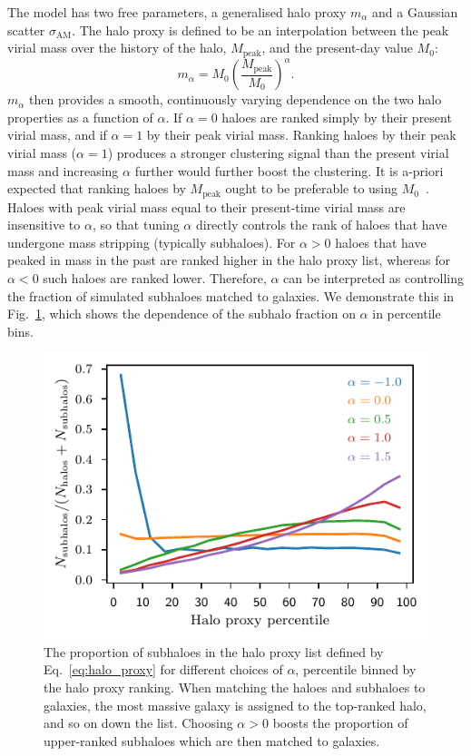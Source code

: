 \documentclass[usenatbib,useAMS]{mnras}
\newcommand{\scatter}{\ensuremath{\sigma_{\mathrm{AM}}}}
\begin{document}
The model has two free parameters, a generalised halo proxy $m_{\alpha}$ and a Gaussian scatter $\scatter$. The halo proxy is defined to be an interpolation between the peak virial mass over the history of the halo, $M_\text{peak}$, and the present-day value $M_0$:
%
\begin{equation}\label{eq:halo_proxy}
    m_{\alpha}
    =
    M_0
    \left( \frac{M_{\mathrm{peak}}}{M_0} \right)^{\alpha}.
\end{equation}
%
$m_{\alpha}$ then provides a smooth, continuously varying dependence on the two halo properties as a function of $\alpha$. If $\alpha = 0$ haloes are ranked simply by their present virial mass, and if $\alpha = 1$ by their peak virial mass. Ranking haloes by their peak virial mass ($\alpha = 1$) produces a stronger clustering signal than the present virial mass and increasing $\alpha$ further would further boost the clustering. It is a-priori expected that ranking haloes by $M_\text{peak}$ ought to be preferable to using $M_0$~\citep{Conroy2006}. Haloes with peak virial mass equal to their present-time virial mass are insensitive to $\alpha$, so that tuning $\alpha$ directly controls the rank of haloes that have undergone mass stripping (typically subhaloes). For $\alpha > 0$ haloes that have peaked in mass in the past are ranked higher in the halo proxy list, whereas for $\alpha < 0$ such haloes are ranked lower. Therefore, $\alpha$ can be interpreted as controlling the fraction of simulated subhaloes matched to galaxies.
We demonstrate this in Fig.~\ref{fig:subhalo_fractions}, which shows the dependence of the subhalo fraction on $\alpha$ in percentile bins.

% 
\begin{figure}
    \centering
    \includegraphics[width=1.0\columnwidth]{Figures/mvir_subhalos_fractions.pdf}
    \caption{The proportion of subhaloes in the halo proxy list defined by Eq.~\eqref{eq:halo_proxy} for different choices of $\alpha$, percentile binned by the halo proxy ranking. When matching the haloes and subhaloes to galaxies, the most massive galaxy is assigned to the top-ranked halo, and so on down the list. Choosing $\alpha > 0$ boosts the proportion of upper-ranked subhaloes which are then matched to galaxies.}
    \label{fig:subhalo_fractions}
\end{figure}
\end{document}
